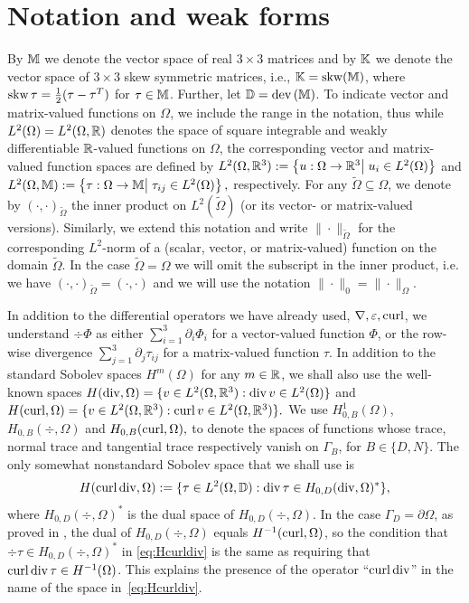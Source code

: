 \section{Notation and weak forms} \label{sec::prelim}

 By $\mathbb{M}$ we denote the vector space of real $3 \times 3$ matrices and
by $\mathbb{K}$ we denote the vector space of $3 \times 3$ skew symmetric
matrices, i.e., $\mathbb{K} = \operatorname{skw}(\mathbb{M})$, where $\operatorname{skw} \tau
= \frac{1}{2} (\tau - \tau^T)$ for $\tau \in \mathbb{M}$. Further, let
$\mathbb{D} = \operatorname{dev}{(\mathbb{M})}$. To indicate vector and matrix-valued functions on
$\Omega$, we include the range in the notation, thus while
$L^2(\Omega) = L^2(\Omega, \mathbb{R})$ denotes the space of square
integrable and weakly differentiable $\mathbb{R}$-valued functions on
$\Omega$, the corresponding vector and matrix-valued function spaces
are defined by
$L^2(\Omega, \mathbb{R}^3) := \left\{ u : \Omega \to \mathbb{R}^3 \big| \;u_i \in
L^2(\Omega)\right\}$ and $  L^2(\Omega,\mathbb{M} ) := \left\{ \tau : \Omega
\to {\mathbb{M}} \big|\; \tau_{ij} \in L^2(\Omega)\right\},$ respectively.
For any ${\tilde{\Omega}} \subseteq \Omega$,  we
denote by $(\cdot,\cdot)_{\tilde{\Omega}}$ the inner product on $L^2({\tilde{\Omega}})$
(or its vector- or matrix-valued versions). Similarly, we extend this
notation and write $\| \cdot \|_{{\tilde{\Omega}}}$ for the corresponding
$L^2$-norm of a (scalar, vector, or matrix-valued) function on the domain ${\tilde{\Omega}}$. In the case ${\tilde{\Omega}} =
\Omega$ we will omit the subscript in the inner product, i.e. we have
$(\cdot,\cdot)_{\tilde{\Omega}} = (\cdot,\cdot)$ and we will use the notation
$\| \cdot \|_0 = \| \cdot \|_\Omega$.

 In addition to the differential operators we have already used, 
 $\nabla, \varepsilon, \operatorname{curl}$, 
we understand $\div \Phi $ as either
$\sum_{i=1}^3 \partial_i \Phi_i$ for a vector-valued function $\Phi$,
or the row-wise divergence $\sum_{j=1}^3 \partial_j \tau_{ij}$ for a
matrix-valued function $\tau$. %
In addition to the standard
Sobolev spaces $H^m(\Omega)$ for any $m\in \mathbb{R}$, we shall also use the
well-known spaces
$H(\operatorname{div},\Omega) = \{ v \in L^2(\Omega, \mathbb{R}^3):
 \operatorname{div} v  \in L^2(\Omega) \}$
and $ H(\operatorname{curl},\Omega) = \{ v \in L^2(\Omega, \mathbb{R}^3):
 \operatorname{curl} v \in L^2(\Omega,\mathbb{R}^3) \}.$
 We use $H^1_{0,B}(\Omega)$, $H_{0,B}(\div, \Omega)$ and
 $H_{0,B}(\operatorname{curl}, \Omega),$ to denote the spaces of functions whose
 trace, normal trace and tangential trace respectively vanish on
 $\Gamma_B$, for $B \in \{ D, N \}$.
The only somewhat nonstandard Sobolev space that we shall use is 
\begin{align}
  \label{eq:Hcurldiv}
  H(\operatorname{curl} \operatorname{div}, \Omega) := \{ \tau \in L^2(\Omega,\mathbb{D}): \operatorname{div} \tau  \in H_{0,D}(\operatorname{div}, \Omega)^*\},
\end{align}
where $H_{0,D}(\div, \Omega)^*$ is the dual space of
$H_{0, D}(\div, \Omega)$. In the case $\Gamma_D = \partial\Omega$, as
proved in \cite{mcsI}, the dual of $H_{0, D}(\div, \Omega)$ equals
$H^{-1}(\operatorname{curl}, \Omega)$, so the condition that
$\div \tau  \in H_{0,D}(\div, \Omega)^*$ in \eqref{eq:Hcurldiv}
is the same as requiring that $\operatorname{curl} \operatorname{div} \tau \in H^{-1}(\Omega)$.
This explains the presence of the operator ``$\operatorname{curl} \operatorname{div}$'' in the
name of the space in~\eqref{eq:Hcurldiv}.

